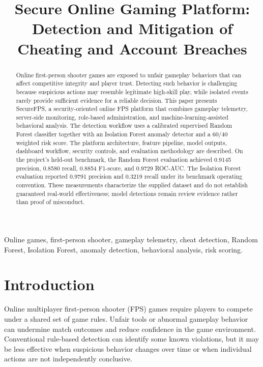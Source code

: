 \documentclass[conference]{IEEEtran}
\begin{document}
\title{Secure Online Gaming Platform: Detection and Mitigation of Cheating and Account Breaches}

\author{
}

\maketitle

\begin{abstract}
Online first-person shooter games are exposed to unfair gameplay behaviors that can affect competitive integrity and player trust. Detecting such behavior is challenging because suspicious actions may resemble legitimate high-skill play, while isolated events rarely provide sufficient evidence for a reliable decision. This paper presents SecureFPS, a security-oriented online FPS platform that combines gameplay telemetry, server-side monitoring, role-based administration, and machine-learning-assisted behavioral analysis. The detection workflow uses a calibrated supervised Random Forest classifier together with an Isolation Forest anomaly detector and a 60/40 weighted risk score. The platform architecture, feature pipeline, model outputs, dashboard workflow, security controls, and evaluation methodology are described. On the project's held-out benchmark, the Random Forest evaluation achieved 0.9145 precision, 0.8580 recall, 0.8854 F1-score, and 0.9729 ROC-AUC. The Isolation Forest evaluation reported 0.9791 precision and 0.3219 recall under its benchmark operating convention. These measurements characterize the supplied dataset and do not establish guaranteed real-world effectiveness; model detections remain review evidence rather than proof of misconduct.
\end{abstract}

\begin{IEEEkeywords}
Online games, first-person shooter, gameplay telemetry, cheat detection, Random Forest, Isolation Forest, anomaly detection, behavioral analysis, risk scoring.
\end{IEEEkeywords}

\section{Introduction}
Online multiplayer first-person shooter (FPS) games require players to compete under a shared set of game rules. Unfair tools or abnormal gameplay behavior can undermine match outcomes and reduce confidence in the game environment. Conventional rule-based detection can identify some known violations, but it may be less effective when suspicious behavior changes over time or when individual actions are not independently conclusive.
\end{document}

